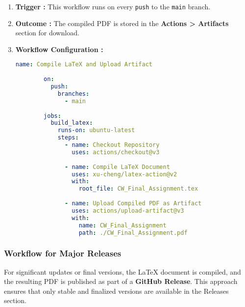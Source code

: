 \documentclass[12pt]{article}
\begin{document}
\begin{enumerate}
    \item \textbf{Trigger :} This workflow runs on every \texttt{push} to the \texttt{main} branch.
    \item \textbf{Outcome :} The compiled PDF is stored in the \textbf{Actions > Artifacts} section for download.
    \item \textbf{Workflow Configuration :}
    \begin{lstlisting}[language=yaml, caption=Workflow for Intermediate Versions]
        name: Compile LaTeX and Upload Artifact
        
        on:
          push:
            branches:
              - main
        
        jobs:
          build_latex:
            runs-on: ubuntu-latest
            steps:
              - name: Checkout Repository
                uses: actions/checkout@v3
        
              - name: Compile LaTeX Document
                uses: xu-cheng/latex-action@v2
                with:
                  root_file: CW_Final_Assignment.tex
        
              - name: Upload Compiled PDF as Artifact
                uses: actions/upload-artifact@v3
                with:
                  name: CW_Final_Assignment
                  path: ./CW_Final_Assignment.pdf
        \end{lstlisting}
        
\end{enumerate}

\subsubsection{Workflow for Major Releases}

For significant updates or final versions, the LaTeX document is compiled, and the resulting PDF is published as part of a \textbf{GitHub Release}. This approach ensures that only stable and finalized versions are available in the Releases section.
\end{document}

